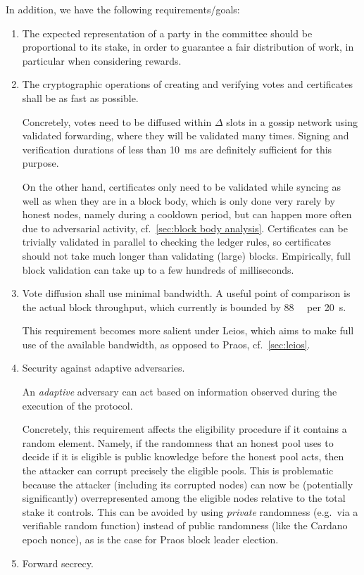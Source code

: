 In addition, we have the following requirements/goals:
\begin{enumerate}
\item\label{enumi:cert reqs fairness}
  The expected representation of a party in the committee should be proportional to its stake, in order to guarantee a fair distribution of work, in particular when considering rewards.
\item
  The cryptographic operations of creating and verifying votes and certificates shall be as fast as possible.

  Concretely, votes need to be diffused within $\Delta$ slots in a gossip network using validated forwarding, where they will be validated many times. Signing and verification durations of less than \qty{10}{\milli\s} are definitely sufficient for this purpose.

  On the other hand, certificates only need to be validated while syncing as well as when they are in a block body, which is only done very rarely by honest nodes, namely during a cooldown period, but can happen more often due to adversarial activity, cf.~\cref{sec:block body analysis}.
  Certificates can be trivially validated in parallel to checking the ledger rules, so certificates should not take much longer than validating (large) blocks.
  Empirically, full block validation can take up to a few hundreds of milliseconds.
\item
  Vote diffusion shall use minimal bandwidth.
  A useful point of comparison is the actual block throughput, which currently is bounded by \qty{88}{\kibi\byte} per \qty{20}{\s}.

  This requirement becomes more salient under Leios, which aims to make full use of the available bandwidth, as opposed to Praos, cf.~\cref{sec:leios}.
\item
  Security against adaptive adversaries.

  An \emph{adaptive} adversary can act based on information observed during the execution of the protocol.

  Concretely, this requirement affects the eligibility procedure if it contains a random element.
  Namely, if the randomness that an honest pool uses to decide if it is eligible is public knowledge before the honest pool acts, then the attacker can corrupt precisely the eligible pools.
  This is problematic because the attacker (including its corrupted nodes) can now be (potentially significantly) overrepresented among the eligible nodes relative to the total stake it controls.
  This can be avoided by using \emph{private} randomness (e.g.\ via a verifiable random function) instead of public randomness (like the Cardano epoch nonce), as is the case for Praos block leader election.
\item
  Forward secrecy.


\end{enumerate}
